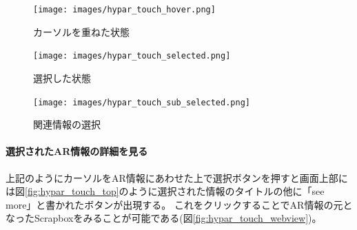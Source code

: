 \begin{figure}[h]
  \begin{minipage}{0.5\hsize}
    \centering
    \texttt{[image: images/hypar\_touch\_hover.png]}
    \caption{カーソルを重ねた状態} \label{fig:hypar_touch_hover}
  \end{minipage}
  \begin{minipage}{0.5\hsize}
    \centering
    \texttt{[image: images/hypar\_touch\_selected.png]}
    \caption{選択した状態} \label{fig:hypar_touch_selected}
  \end{minipage}
\end{figure}

\begin{figure}[h]
    \centering
    \texttt{[image: images/hypar\_touch\_sub\_selected.png]}
    \caption{関連情報の選択} \label{fig:hypar_touch_sub_selected}
\end{figure}


\paragraph*{選択されたAR情報の詳細を見る}
上記のようにカーソルをAR情報にあわせた上で選択ボタンを押すと画面上部には図\ref{fig:hypar_touch_top}のように選択された情報のタイトルの他に「see more」と書かれたボタンが出現する。
これをクリックすることでAR情報の元となったScrapboxをみることが可能である(図\ref{fig:hypar_touch_webview})。

